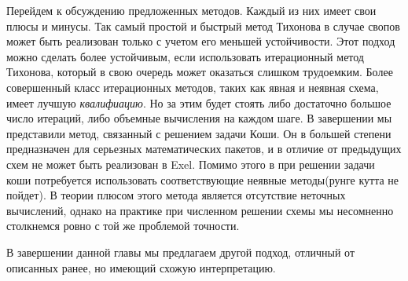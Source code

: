 \documentclass[10pt]{article}
\theoremstyle{definition}
\theoremstyle{remark}
\theoremstyle{plain}
\newcommand{\wt}{\widetilde}
\begin{document}
Перейдем к обсуждению предложенных методов. Каждый из них имеет свои плюсы и минусы. Так самый простой и быстрый метод Тихонова в случае свопов может быть реализован только с учетом его меньшей устойчивости.  Этот подход можно сделать более устойчивым, если использовать итерационный метод Тихонова, который в свою очередь может оказаться слишком трудоемким. Более совершенный класс итерационных методов, таких как явная и неявная схема, имеет лучшую \textit{квалифиацию}. Но за этим будет стоять либо достаточно большое число итераций, либо объемные вычисления на каждом шаге. В завершении мы представили метод, связанный с решением задачи Коши. Он в большей степени предназначен для серьезных математических пакетов, и в отличие от предыдущих схем не может быть реализован в Exel.  Помимо этого в при решении задачи коши потребуется использовать соответствующие неявные методы(рунге кутта не пойдет). В теории плюсом этого метода является отсутствие неточных вычислений, однако на практике при численном решении схемы мы несомненно столкнемся ровно с той же проблемой точности.




В завершении данной главы мы предлагаем другой подход, отличный от описанных ранее, но имеющий схожую интерпретацию.
\end{document}
